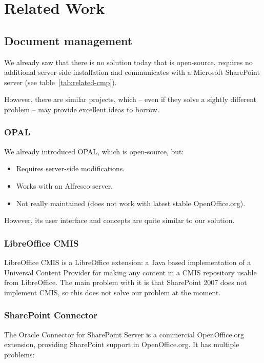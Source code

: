 \chapter{Related Work}

\section{Document management}

We already saw that there is no solution today that is open-source, requires no
additional server-side installation and communicates with a Microsoft
SharePoint server (see table~\ref{tab:related-cmp}).

However, there are similar projects, which -- even if they
solve a sightly different problem -- may provide excellent ideas to borrow.

\subsection*{OPAL}
We already introduced OPAL, which is open-source, but:

\begin{itemize}
\item Requires server-side modifications.
\item Works with an Alfresco server.
\item Not really maintained (does not work with latest stable OpenOffice.org).
\end{itemize}

However, its user interface and concepts are quite similar to our solution.

\subsection*{LibreOffice CMIS}
LibreOffice CMIS \cite{locmis} is a LibreOffice extension: a Java based
implementation of a Universal Content Provider for making any content in a CMIS
repository usable from LibreOffice. The main problem with it is that SharePoint
2007 does not implement CMIS, so this does not solve our problem at the moment.

\subsection*{SharePoint Connector}
The Oracle Connector for SharePoint Server \cite{oracle-sp-connector} is a
commercial OpenOffice.org extension, providing SharePoint support in
OpenOffice.org. It has multiple problems:

